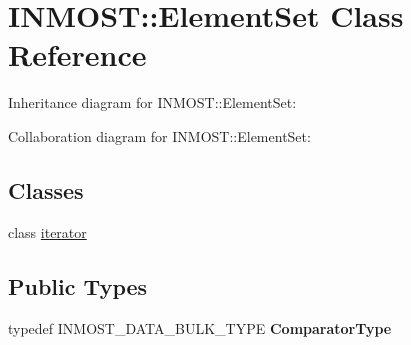 \hypertarget{classINMOST_1_1ElementSet}{\section{I\-N\-M\-O\-S\-T\-:\-:Element\-Set Class Reference}
\label{classINMOST_1_1ElementSet}
}


Inheritance diagram for I\-N\-M\-O\-S\-T\-:\-:Element\-Set\-:


Collaboration diagram for I\-N\-M\-O\-S\-T\-:\-:Element\-Set\-:
\subsection*{Classes}
\begin{DoxyCompactItemize}
\item 
class \hyperlink{classINMOST_1_1ElementSet_1_1iterator}{iterator}
\end{DoxyCompactItemize}
\subsection*{Public Types}
\begin{DoxyCompactItemize}
\item 
\hypertarget{classINMOST_1_1ElementSet_aa2d038b0def08087dc87e30ea4ba6f36}{typedef I\-N\-M\-O\-S\-T\-\_\-\-D\-A\-T\-A\-\_\-\-B\-U\-L\-K\-\_\-\-T\-Y\-P\-E {\bfseries Comparator\-Type}}\label{classINMOST_1_1ElementSet_aa2d038b0def08087dc87e30ea4ba6f36}

\end{DoxyCompactItemize}
